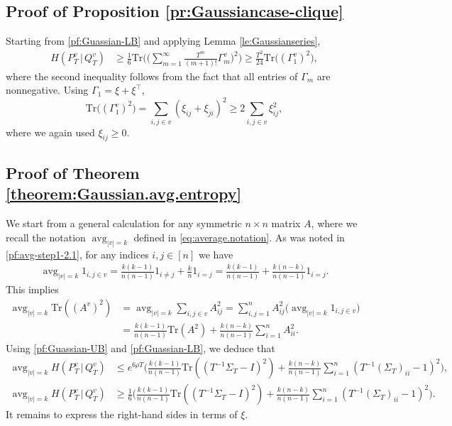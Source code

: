 \documentclass[11pt,reqno]{amsart}
\numberwithin{equation}{section}
\theoremstyle{definition}
\def\BB{{\Gamma}}
\def\tr{{\mathrm{Tr}}}
\DeclareMathOperator*{\avg}{avg}
\begin{document}
 


\subsection{Proof of Proposition \ref{pr:Gaussiancase-clique}}
Starting from \eqref{pf:Guassian-LB} and applying Lemma \ref{le:Gaussianseries},
\begin{align*}
H(P^v_T\,|\,Q^v_T) &\ge \frac16\tr \bigg(\bigg(\sum_{m=1}^{\infty} \frac{T^m}{(m+1)!} \BB_m^v\bigg)^2\bigg) \ge \frac{T^2}{24}\tr\big((\Gamma_1^v)^2\big),
\end{align*}
where the second inequality follows from the fact that all entries of $\Gamma_m$ are nonnegative. Using $\Gamma_1=\xi + \xi^\top$, 
\begin{equation*}
\tr\big((\Gamma_1^v)^2\big) = \sum_{i,j \in v}(\xi_{ij} + \xi_{ji})^2 \ge 2\sum_{i,j \in v} \xi_{ij}^2,
\end{equation*} 
where we again used $\xi_{ij} \ge 0$. \hfill\qedsymbol


\subsection{Proof of Theorem \ref{theorem:Gaussian.avg.entropy}}

We start from a general calculation for any symmetric $n \times n$ matrix $A$, where we recall the notation $\avg_{|v|=k}$ defined in \eqref{eq:average.notation}.
As was noted in \eqref{pf:avg-step1-2.1}, for any indices $i,j \in [n]$ we have
\begin{align*}
\avg_{|v|=k} 1_{i,j \in v} = \frac{k(k-1)}{n(n-1)}1_{i\neq j} + \frac{k}{n}1_{i=j} = \frac{k(k-1)}{n(n-1)} + \frac{k(n-k)}{n(n-1)} 1_{i=j}.
\end{align*}
This implies
\begin{align}
\avg_{|v|=k} \tr((A^v)^2) &= \avg_{|v|=k} \sum_{i,j \in v} A_{ij}^2 = \sum_{i,j=1}^n A_{ij}^2  \big(\avg_{|v|=k} 1_{i,j \in v} \big) \nonumber \\
	&= \frac{k(k-1)}{n(n-1)}\tr(A^2) + \frac{k(n-k)}{n(n-1)}\sum_{i=1}^n A_{ii}^2 .  \label{avgtrace} 
\end{align}
Using \eqref{pf:Guassian-UB} and \eqref{pf:Guassian-LB}, we deduce that
\begin{align}
\avg_{|v|=k} H(P^v_T\,|\,Q^v_T) &\le e^{6\rho T}  \bigg(\frac{k(k-1)}{n(n-1)}\tr((T^{-1}\Sigma_T - I)^2) +  \frac{k(n-k)}{n(n-1)}\sum_{i=1}^n (T^{-1}(\Sigma_T)_{ii}-1)^2\bigg), \label{avgbound-UB} \\
\avg_{|v|=k} H(P^v_T\,|\,Q^v_T) &\ge \frac16 \bigg(\frac{k(k-1)}{n(n-1)}\tr((T^{-1}\Sigma_T - I)^2) +  \frac{k(n-k)}{n(n-1)}\sum_{i=1}^n (T^{-1}(\Sigma_T)_{ii}-1)^2\bigg). \label{avgbound-LB}
\end{align} 
It remains to express the right-hand sides in terms of $\xi$.
\end{document}
